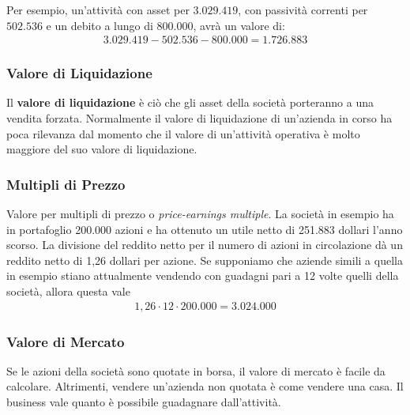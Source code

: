 \documentclass[a4paper,portrait,12pt]{article}
\theoremstyle{definition}
\begin{document}
Per esempio, un'attività con asset per $3.029.419$, con passività correnti per $502.536$ e un debito a lungo di $800.000$, avrà un valore di:
\begin{align*}
3.029.419 - 502.536 - 800.000 = 1.726.883
\end{align*}

\subsubsection{Valore di Liquidazione}

Il \textbf{valore di liquidazione} è ciò che gli asset della società porteranno a una vendita forzata.
Normalmente il valore di liquidazione di un'azienda in corso ha poca rilevanza dal momento che il valore di un'attività operativa è molto maggiore del suo valore di liquidazione.


\subsubsection{Multipli di Prezzo}

Valore per multipli di prezzo o \emph{price-earnings multiple}.
La società in esempio ha in portafoglio 200.000 azioni e ha ottenuto un utile netto di 251.883 dollari l'anno scorso.
La divisione del reddito netto per il numero di azioni in circolazione dà un reddito netto di 1,26 dollari per azione.
Se supponiamo che aziende simili a quella in esempio stiano attualmente vendendo con guadagni pari a 12 volte quelli della società, allora questa	 vale
\begin{align*}
1,26 \cdot 12 \cdot 200.000 = 3.024.000
\end{align*}

\subsubsection{Valore di Mercato}

Se le azioni della società sono quotate in borsa, il valore di mercato è facile da calcolare.
Altrimenti, vendere un'azienda non quotata è come vendere una casa.
Il business vale quanto è possibile guadagnare dall'attività.
\end{document}
